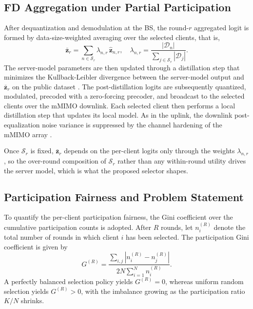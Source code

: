 \documentclass[journal]{IEEEtran}
\begin{document}
\subsection{FD Aggregation under Partial Participation}
\label{ssec:fd-aggregation}

After dequantization and demodulation at the BS, the round-$r$ aggregated logit is formed by data-size-weighted averaging over the selected clients, that is,
\begin{equation}
\bar{\bm{z}}_r = \sum_{n \in \mathcal{S}_r} \lambda_{n,r} \, \hat{\bm{z}}_{n,r}, \quad \lambda_{n,r} = \frac{|\mathcal{D}_n|}{\sum_{j \in \mathcal{S}_r} |\mathcal{D}_j|}.
\label{eq:agg}
\end{equation}
The server-model parameters are then updated through a distillation step that minimizes the Kullback-Leibler divergence between the server-model output and $\bar{\bm{z}}_r$ on the public dataset \cite{hinton2015distilling}. The post-distillation logits are subsequently quantized, modulated, precoded with a zero-forcing precoder, and broadcast to the selected clients over the mMIMO downlink. Each selected client then performs a local distillation step that updates its local model. As in the uplink, the downlink post-equalization noise variance is suppressed by the channel hardening of the mMIMO array \cite{mu2024fedtskd}.

Once $\mathcal{S}_r$ is fixed, $\bar{\bm{z}}_r$ depends on the per-client logits only through the weights $\lambda_{n,r}$, so the over-round composition of $\mathcal{S}_r$ rather than any within-round utility drives the server model, which is what the proposed selector shapes.

\subsection{Participation Fairness and Problem Statement}
\label{ssec:problem-statement}

To quantify the per-client participation fairness, the Gini coefficient over the cumulative participation counts is adopted. After $R$ rounds, let $n_i^{(R)}$ denote the total number of rounds in which client $i$ has been selected. The participation Gini coefficient is given by
\begin{equation}
G^{(R)} = \frac{\sum_{i,j} \left|n_i^{(R)} - n_j^{(R)}\right|}{2N \sum_{i=1}^{N} n_i^{(R)}}.
\label{eq:gini}
\end{equation}
A perfectly balanced selection policy yields $G^{(R)} = 0$, whereas uniform random selection yields $G^{(R)} > 0$, with the imbalance growing as the participation ratio $K/N$ shrinks.
\end{document}
